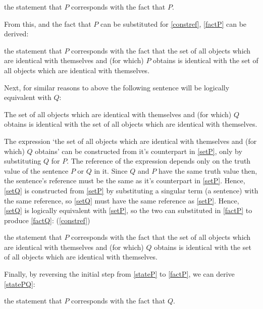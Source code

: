 	\begin{example} \label{stateP}
	the statement that $P$ corresponds with the fact that $P$.
	\end{example}

From this, and the fact that $P$ can be substituted for \ref{constref}, \ref{factP} can be derived:

	\begin{example} \label{factP}
	the statement that $P$ corresponds with the fact that the set of all objects which are identical with themselves and (for which) $P$ obtains is identical with the set of all objects which are identical with themselves.
	\end{example}

Next, for similar reasons to above the following sentence will be logically equivalent with $Q$:

	\begin{example} \label{setQ}
	The set of all objects which are identical with themselves and (for which) $Q$ obtains is identical with the set of all objects which are identical with themselves.
	\end{example}

The expression `the set of all objects which are identical with themselves and (for which) $Q$ obtains' can be constructed from it's counterpart in \ref{setP}, only by substituting $Q$ for $P$.
The reference of the expression depends only on the truth value of the sentence $P$ or $Q$ in it.
Since $Q$ and $P$ have the same truth value then, the sentence's reference must be the same as it's counterpart in \ref{setP}.
Hence, \ref{setQ} is constructed from \ref{setP} by substituting a singular term (a sentence) with the same reference, so \ref{setQ} must have the same reference as \ref{setP}.
Hence, \ref{setQ} is logically equivalent with \ref{setP}, so the two can substituted in \ref{factP} to produce \ref{factQ}:
(\ref{constref})


	\begin{example} \label{factQ}
	the statement that $P$ corresponds with the fact that the set of all objects which are identical with themselves and (for which) $Q$ obtains is identical with the set of all objects which are identical with themselves.
	\end{example}

Finally, by reversing the initial step from \ref{stateP} to \ref{factP}, we can derive \ref{statePQ}:

	\begin{example} \label{statePQ}
	the statement that $P$ corresponds with the fact that $Q$.
	\end{example}

